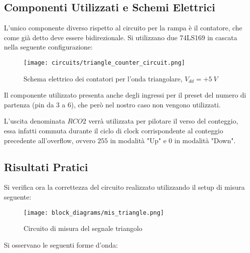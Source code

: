 
\subsection*{Componenti Utilizzati e Schemi Elettrici}


L'unico componente diverso rispetto al circuito per la rampa è il contatore, che come già
detto deve essere bidirezionale. Si utilizzano due 74LS169 \cite{74ls169} in cascata nella
seguente configurazione:

\begin{figure}[H]
    \centering
    \texttt{[image: circuits/triangle\_counter\_circuit.png]}
    \caption{Schema elettrico dei contatori per l'onda triangolare, $V_{dd}=+5\ V$}
    \label{triangle_counter_circuit}
\end{figure}

Il componente utilizzato presenta anche degli ingressi per il preset del numero di partenza
(pin da 3 a 6), che però nel nostro caso non vengono utilizzati.

L'uscita denominata $RCO2$ verrà utilizzata per pilotare il verso del conteggio, essa infatti
commuta durante il ciclo di clock corrispondente al conteggio precedente all'overflow, ovvero
$255$ in modalità "Up" e $0$ in modalità "Down".


\subsection*{Risultati Pratici}


Si verifica ora la correttezza del circuito realizzato utilizzando il setup di misura seguente:

\begin{figure}[H]
    \centering
    \texttt{[image: block\_diagrams/mis\_triangle.png]}
    \caption{Circuito di misura del segnale triangolo}
    \label{mis_triangle}
\end{figure}

Si osservano le seguenti forme d'onda:

